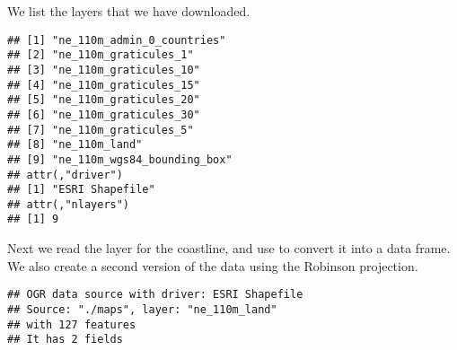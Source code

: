 \documentclass[paper=a4,10pt,div=17,headsepline,BCOR=12mm,twoside,open=right]{scrbook}\usepackage{knitr}
\begin{document}
We list the layers that we have downloaded.

\begin{knitrout}\footnotesize
{}\color{fgcolor}\begin{kframe}
\begin{alltt}
\hlstd{(}\hlstd{=}\hlstd{)}
\end{alltt}
\begin{verbatim}
## [1] "ne_110m_admin_0_countries" 
## [2] "ne_110m_graticules_1"      
## [3] "ne_110m_graticules_10"     
## [4] "ne_110m_graticules_15"     
## [5] "ne_110m_graticules_20"     
## [6] "ne_110m_graticules_30"     
## [7] "ne_110m_graticules_5"      
## [8] "ne_110m_land"              
## [9] "ne_110m_wgs84_bounding_box"
## attr(,"driver")
## [1] "ESRI Shapefile"
## attr(,"nlayers")
## [1] 9
\end{verbatim}
\end{kframe}
\end{knitrout}

Next we read the layer for the coastline, and use  to convert it into a data frame. We also create a second version of the data using the Robinson projection.

\begin{knitrout}\footnotesize
{}\color{fgcolor}\begin{kframe}
\begin{alltt}
 \hlkwb{<-} \hlstd{(}\hlstd{=}\hlstd{,} \hlstd{=}\hlstd{)}
\end{alltt}
\begin{verbatim}
## OGR data source with driver: ESRI Shapefile 
## Source: "./maps", layer: "ne_110m_land"
## with 127 features
## It has 2 fields
\end{verbatim}
\begin{alltt}
 \hlkwb{<-} 
\end{alltt}


{\ttfamily\noindent\itshape\color{messagecolor}{\#\# Regions defined for each Polygons}}\begin{alltt}
 \hlkwb{<-}  \hlstd{(}\hlstd{))}
 \hlkwb{<-} 
\end{alltt}


{\ttfamily\noindent\itshape\color{messagecolor}{\#\# Regions defined for each Polygons}}\end{kframe}
\end{knitrout}
\end{document}
